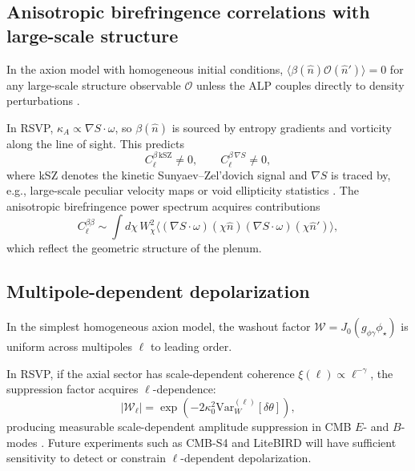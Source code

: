 \documentclass[12pt]{article}
\theoremstyle{definition}
\newcommand{\kA}{\kappa_A}
\newcommand{\VarW}{\mathrm{Var}_W}
\newcommand{\PLSSphi}{\phi_\star}
\newcommand{\gpg}{g_{\phi\gamma}}
\begin{document}
\subsection{Anisotropic birefringence correlations with large-scale structure}

In the axion model with homogeneous initial conditions,
$\langle\beta(\hat{n})\mathcal{O}(\hat{n}')\rangle=0$ for any large-scale
structure observable $\mathcal{O}$ unless the ALP couples directly to
density perturbations \cite{Pospelov2009,Arvanitaki2010}.

In RSVP, $\kA\propto\nabla S\cdot\omega$, so $\beta(\hat{n})$ is sourced
by entropy gradients and vorticity along the line of sight.
This predicts
\begin{equation}
  C_\ell^{\beta\,\mathrm{kSZ}}\neq0,
  \qquad
  C_\ell^{\beta\,\nabla S}\neq0,
  \label{eq:cross_correlations}
\end{equation}
where kSZ denotes the kinetic Sunyaev--Zel'dovich signal
\cite{Sunyaev1980,Ma2002} and $\nabla S$ is traced by, e.g.,
large-scale peculiar velocity maps or void ellipticity statistics
\cite{Lavaux2010,Hamaus2015}.
The anisotropic birefringence power spectrum \cite{Gluscevic2012,Yadav2012}
acquires contributions
\begin{equation}
  C_\ell^{\beta\beta}
  \sim \int d\chi\,W_\chi^2
    \langle(\nabla S\cdot\omega)(\chi\hat{n})
           (\nabla S\cdot\omega)(\chi\hat{n}')\rangle,
\end{equation}
which reflect the geometric structure of the plenum.

\subsection{Multipole-dependent depolarization}

In the simplest homogeneous axion model, the washout factor
$\mathcal{W}=J_0(\gpg\PLSSphi)$ is uniform across multipoles $\ell$
to leading order.

In RSVP, if the axial sector has scale-dependent coherence
$\xi(\ell)\propto\ell^{-\gamma}$, the suppression factor acquires
$\ell$-dependence:
\begin{equation}
  |\mathcal{W}_\ell|
  = \exp\!\left(-2\kappa_0^2\VarW^{(\ell)}[\delta\theta]\right),
  \label{eq:ell_dep}
\end{equation}
producing measurable scale-dependent amplitude suppression in CMB
$E$- and $B$-modes \cite{Gluscevic2012,Sherfield2023,SPTPol2021}.
Future experiments such as CMB-S4 \cite{CMBS4} and LiteBIRD
\cite{LiteBIRD2022} will have sufficient sensitivity to detect or
constrain $\ell$-dependent depolarization.
\end{document}
